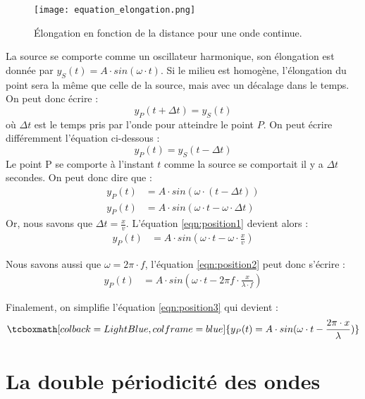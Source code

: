 \begin{figure}[ht!]
    \centering
    \texttt{[image: equation\_elongation.png]}
    \caption{Élongation en fonction de la distance pour une onde continue.}
    \label{equation_elongation}
\end{figure}

La source se comporte comme un oscillateur harmonique, son élongation est donnée par  \(y_S (t)=A \cdot sin(\omega \cdot t)\).
Si le milieu est homogène, l'élongation du point sera la même que celle de la source, mais avec un décalage dans le temps. On peut donc écrire :
\begin{equation}
    y_P (t + \Delta t)   = y_S (t)
\end{equation}
où \(\Delta t\) est le temps pris par l'onde pour atteindre le point \(P\).
On peut écrire différemment l'équation ci-dessous :
\begin{equation}
    y_P (t)   = y_S (t - \Delta t)
\end{equation}
Le point P se comporte à l'instant \(t\) comme la source se comportait il y a \(\Delta t\) secondes.
On peut donc dire que :
\begin{align}
    y_P (t) & = A \cdot sin (\omega \cdot(t-\Delta t))             \\
    y_P (t) & = A \cdot sin (\omega \cdot t-\omega \cdot \Delta t)
    \label{eqn:position1}
\end{align}
Or, nous savons que \(\Delta t =\frac{x}{v}\). L'équation \ref{eqn:position1} devient alors :
\begin{align}
    y_P (t) & = A \cdot sin (\omega \cdot t-\omega \cdot \frac{x}{v})
    \label{eqn:position2}
\end{align}

Nous savons aussi que \(\omega = 2 \pi \cdot f\), l'équation \ref{eqn:position2} peut donc s'écrire :
\begin{align}
    y_P (t) & = A \cdot sin (\omega \cdot t-2 \pi f \cdot \frac{x}{\lambda \cdot f})
    \label{eqn:position3}
\end{align}

Finalement, on simplifie l'équation \ref{eqn:position3} qui devient :
\begin{equation}
    \tcboxmath[colback=LightBlue,colframe=blue]{y_P (t)= A \cdot sin (\omega \cdot t- \frac{2 \pi  \cdot x}{\lambda})}
\end{equation}

\newpage

\section{La double périodicité des ondes}
